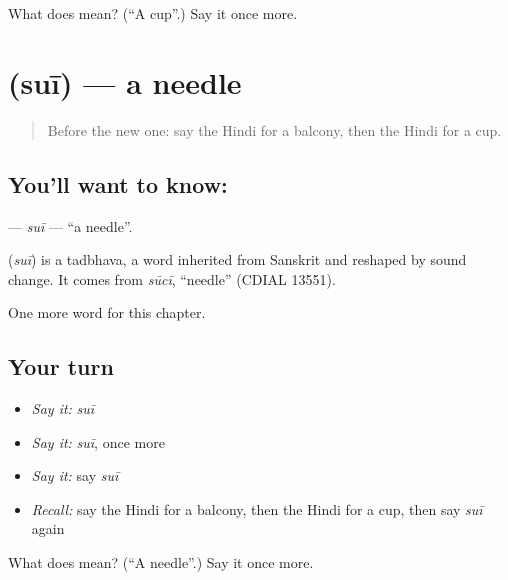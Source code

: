\begin{tcolorbox}[breakable,colback=teal!4,colframe=teal!35!black,title={Before you move on}]
What does  mean? (\textquotedblleft{}A cup\textquotedblright{}.) Say it once more.
\end{tcolorbox}
\section[\texorpdfstring{\hi{सुई} (suī)}{सुई (suī)}]{ (suī) — a needle}

\label{lesson:HI-C209-sui}



\begin{quote}
Before the new one: say the Hindi for a balcony, then the Hindi for a cup.
\end{quote}

\subsection*{You'll want to know: }
\textbf{} — \emph{suī} — \textquotedblleft{}a needle\textquotedblright{}.

\begin{cousinweb}
\textbf{} (\emph{suī}) is a tadbhava, a word inherited from Sanskrit and reshaped by sound change. It comes from \emph{sūcī}, \textquotedblleft{}needle\textquotedblright{} (CDIAL 13551).
\end{cousinweb}

\begin{grammarlens}[title={What you've built}]
One more word for this chapter.
\end{grammarlens}

\subsection*{Your turn}
\begin{itemize}
\raggedright
  \item \emph{Say it:} \emph{suī}
  \item \emph{Say it:} \emph{suī}, once more
  \item \emph{Say it:} say \emph{suī}
  \item \emph{Recall:} say the Hindi for a balcony, then the Hindi for a cup, then say \emph{suī} again
\end{itemize}

\begin{tcolorbox}[breakable,colback=teal!4,colframe=teal!35!black,title={Before you move on}]
What does  mean? (\textquotedblleft{}A needle\textquotedblright{}.) Say it once more.
\end{tcolorbox}

